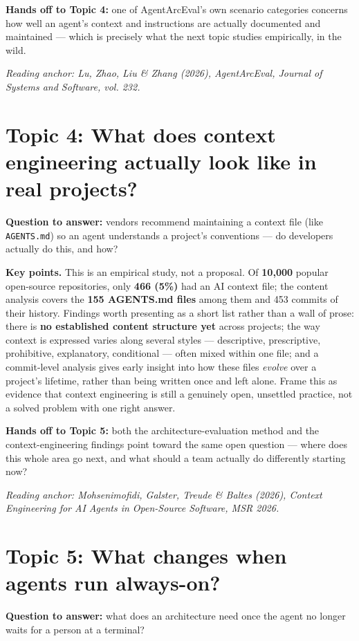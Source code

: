 \documentclass[12pt,a4paper]{article}
\newcommand{\source}[1]{\par\textcolor{teal!70!black}{\textit{Reading anchor: #1}}\par}
\begin{document}
\textbf{Hands off to Topic 4:} one of AgentArcEval's own scenario categories concerns how well an agent's context and instructions are actually documented and maintained --- which is precisely what the next topic studies empirically, in the wild.

\source{Lu, Zhao, Liu \& Zhang (2026), \emph{AgentArcEval}, Journal of Systems and Software, vol. 232.}

\section{Topic 4: What does context engineering actually look like in real projects?}
\textbf{Question to answer:} vendors recommend maintaining a context file (like \texttt{AGENTS.md}) so an agent understands a project's conventions --- do developers actually do this, and how?

\textbf{Key points.} This is an empirical study, not a proposal. Of \textbf{10,000} popular open-source repositories, only \textbf{466 (5\%)} had an AI context file; the content analysis covers the \textbf{155 AGENTS.md files} among them and 453 commits of their history. Findings worth presenting as a short list rather than a wall of prose: there is \textbf{no established content structure yet} across projects; the way context is expressed varies along several styles --- descriptive, prescriptive, prohibitive, explanatory, conditional --- often mixed within one file; and a commit-level analysis gives early insight into how these files \emph{evolve} over a project's lifetime, rather than being written once and left alone. Frame this as evidence that context engineering is still a genuinely open, unsettled practice, not a solved problem with one right answer.

\textbf{Hands off to Topic 5:} both the architecture-evaluation method and the context-engineering findings point toward the same open question --- where does this whole area go next, and what should a team actually do differently starting now?

\source{Mohsenimofidi, Galster, Treude \& Baltes (2026), \emph{Context Engineering for AI Agents in Open-Source Software}, MSR 2026.}

\section{Topic 5: What changes when agents run always-on?}
\textbf{Question to answer:} what does an architecture need once the agent no longer waits for a person at a terminal?
\end{document}
